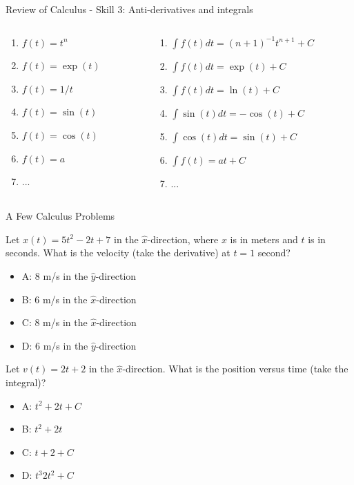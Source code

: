 \documentclass{beamer}
\begin{document}
\begin{frame}{Review of Calculus - Skill 3:  Anti-derivatives and integrals}
\begin{columns}[T]
\begin{column}{0.5\textwidth}
\begin{enumerate}
\item $f(t) = t^n$
\item $f(t) = \exp(t)$
\item $f(t) = 1/t$
\item $f(t) = \sin(t)$
\item $f(t) = \cos(t)$
\item $f(t) = a$
\item ...
\end{enumerate}
\end{column}
\begin{column}{0.5\textwidth}
\begin{enumerate}
\item $\int f(t) dt = (n+1)^{-1}t^{n+1} + C$
\item $\int f(t) dt = \exp(t) + C$
\item $\int f(t) dt = \ln(t) + C$
\item $\int \sin(t) dt = -\cos(t) + C$
\item $\int \cos(t) dt = \sin(t) + C$
\item $\int f(t) = at + C$
\item ...
\end{enumerate}
\end{column}
\end{columns}
\end{frame}

\begin{frame}{A Few Calculus Problems}
\small
\begin{minipage}[b]{0.45\linewidth}
Let $x(t) = 5t^2-2t+7$ in the $\hat{x}$-direction, where $x$ is in meters and $t$ is in seconds.  What is the velocity (take the derivative) at $t=1$ second?
\vspace{0.2cm}
\begin{itemize}
\item A: 8 m/s in the $\hat{y}$-direction
\item B: 6 m/s in the $\hat{x}$-direction
\item C: 8 m/s in the $\hat{x}$-direction
\item D: 6 m/s in the $\hat{y}$-direction
\end{itemize}
\end{minipage}
\hspace{0.5cm}
\begin{minipage}[b]{0.45\linewidth}
Let $v(t) = 2t+2$ in the $\hat{x}$-direction.  What is the position versus time (take the integral)?
\vspace{0.7cm}
\begin{itemize}
\item A: $t^2+2t + C$
\item B: $t^2 +2t$
\item C: $t+2 + C$
\item D: $t^3 2t^2 + C$
\end{itemize}
\end{minipage}
\end{frame}
\end{document}
